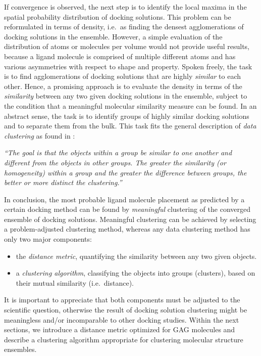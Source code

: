 If convergence is observed, the next step is to identify the local maxima in the
spatial probability distribution of docking solutions. This problem can be
reformulated in terms of density, i.e.\ as finding the densest agglomerations of
docking solutions in the ensemble. However, a simple evaluation of the
distribution of atoms or molecules per volume would not provide useful results,
because a ligand molecule is comprised of multiple different atoms and has
various asymmetries with respect to shape and property. Spoken freely, the task
is to find agglomerations of docking solutions that are highly \textit{similar}
to each other. Hence, a promising approach is to evaluate the density in terms
of the \textit{similarity} between any two given docking solutions in the
ensemble, subject to the condition that a meaningful molecular similarity
measure can be found. In an abstract sense, the task is to identify groups of
highly similar docking solutions and to separate them from the bulk. This task
fits the general description of \textit{data clustering} as found in
\cite{tan_data_mining}:

\begin{adjustwidth}{1.5cm}{1.5cm}
\textit{%
\enquote{The goal is that the objects within a group be similar to one another
and different from the objects in other groups. The greater the similarity (or
homogeneity) within a group and the greater the difference between groups, the
better or more distinct the clustering.}}
\end{adjustwidth}

In conclusion, the most probable ligand molecule placement as predicted by a
certain docking method can be found by \textit{meaningful} clustering of the
converged ensemble of docking solutions. Meaningful clustering can be achieved
by selecting a problem-adjusted clustering method, whereas any data clustering
method has only two major components:

\begin{itemize}
\item the \textit{distance metric}, quantifying the similarity between any two
given objects.
\item a \textit{clustering algorithm}, classifying the objects into groups
(clusters), based on their mutual similarity (i.e.\ distance).
\end{itemize}

It is important to appreciate that both components must be adjusted to the
scientific question, otherwise the result of docking solution clustering might
be meaningless and/or incomparable to other docking studies. Within the next
sections, we introduce a distance metric optimized for GAG molecules and
describe a clustering algorithm appropriate for clustering molecular structure
ensembles.


